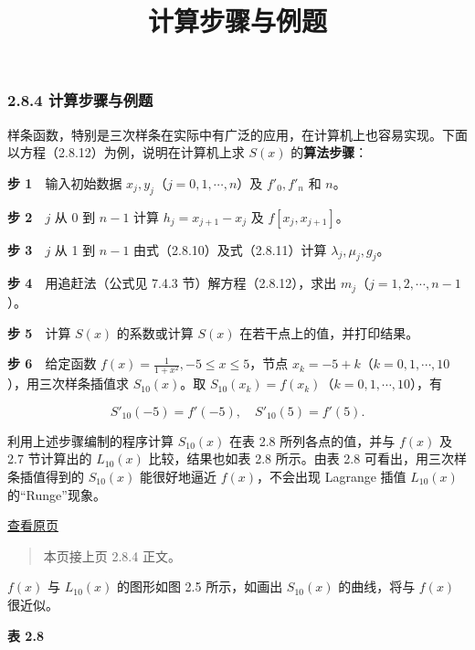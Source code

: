 \documentclass[
  10pt,
  fontset=fandol]{ctexart}
\title{计算步骤与例题}
\author{}
\date{}
\begin{document}
\maketitle

\subsubsection{2.8.4 计算步骤与例题}\label{ux8ba1ux7b97ux6b65ux9aa4ux4e0eux4f8bux9898}

样条函数，特别是三次样条在实际中有广泛的应用，在计算机上也容易实现。下面以方程（2.8.12）为例，说明在计算机上求 \(S(x)\) 的\textbf{算法步骤}：

\textbf{步 1}　输入初始数据 \(x_j,y_j\)（\(j=0,1,\cdots,n\)）及 \(f'_0,f'_n\) 和 \(n\)。

\textbf{步 2}　\(j\) 从 0 到 \(n-1\) 计算 \(h_j=x_{j+1}-x_j\) 及 \(f[x_j,x_{j+1}]\)。

\textbf{步 3}　\(j\) 从 1 到 \(n-1\) 由式（2.8.10）及式（2.8.11）计算 \(\lambda_j,\mu_j,g_j\)。

\textbf{步 4}　用追赶法（公式见 7.4.3 节）解方程（2.8.12），求出 \(m_j\)（\(j=1,2,\cdots,n-1\)）。

\textbf{步 5}　计算 \(S(x)\) 的系数或计算 \(S(x)\) 在若干点上的值，并打印结果。

\textbf{步 6}　给定函数 \(f(x)=\frac1{1+x^2},-5\leqslant x\leqslant5\)，节点 \(x_k=-5+k\)（\(k=0,1,\cdots,10\)），用三次样条插值求 \(S_{10}(x)\)。取 \(S_{10}(x_k)=f(x_k)\)（\(k=0,1,\cdots,10\)），有

\[S'_{10}(-5)=f'(-5),\quad S'_{10}(5)=f'(5).\]

利用上述步骤编制的程序计算 \(S_{10}(x)\) 在表 2.8 所列各点的值，并与 \(f(x)\) 及 2.7 节计算出的 \(L_{10}(x)\) 比较，结果也如表 2.8 所示。由表 2.8 可看出，用三次样条插值得到的 \(S_{10}(x)\) 能很好地逼近 \(f(x)\)，不会出现 Lagrange 插值 \(L_{10}(x)\) 的``Runge''现象。

\href{../../source-images/pdf-054.jpeg}{查看原页}

\begin{quote}
本页接上页 2.8.4 正文。
\end{quote}

\(f(x)\) 与 \(L_{10}(x)\) 的图形如图 2.5 所示，如画出 \(S_{10}(x)\) 的曲线，将与 \(f(x)\) 很近似。

\textbf{表 2.8}
\end{document}
